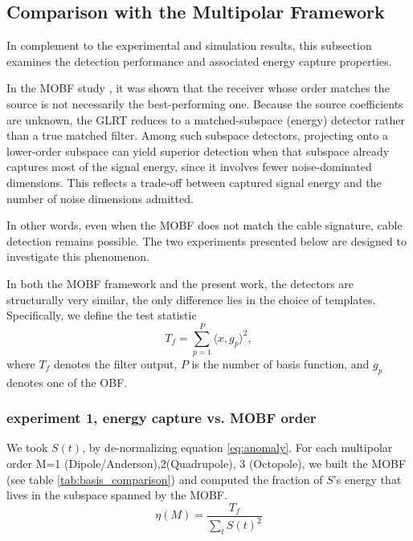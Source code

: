 \subsection{Comparison with the Multipolar Framework}

In complement to the experimental and simulation results, this subsection examines the detection performance and associated energy capture properties.

In the MOBF study \cite{chenevas2025multipolar}, it was shown that the receiver whose order matches the source is not necessarily the best-performing one. Because the source coefficients are unknown, the GLRT reduces to a matched-subspace (energy) detector rather than a true matched filter. Among such subspace detectors, projecting onto a lower-order subspace can yield superior detection when that subspace already captures most of the signal energy, since it involves fewer noise-dominated dimensions. This reflects a trade-off between captured signal energy and the number of noise dimensions admitted.

In other words, even when the MOBF does not match the cable signature, cable detection remains possible. The two experiments presented below are designed to investigate this phenomenon.

In both the MOBF framework and the present work, the detectors are structurally very similar, the only difference lies in the choice of templates. Specifically, we define the test statistic
\begin{equation}
    T_f = \sum_{p=1}^{P} \langle x, g_p \rangle^2,
\end{equation}
where $T_f$ denotes the filter output, $P$ is the number of basis function, and $g_p$ denotes one of the OBF.

\subsubsection{experiment 1, energy capture vs. MOBF order}
We took $S(t)$, by de-normalizing equation \ref{eq:anomaly}. For each multipolar order M=1 (Dipole/Anderson),2(Quadrupole), 3 (Octopole), we built the MOBF (see table \ref{tab:basis_comparison}) and computed the fraction of $S$'s energy that lives in the subspace spanned by the MOBF.
\begin{equation}
    \eta (M) = \frac{T_f}{\sum_t S(t)^2}
\end{equation}

